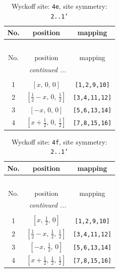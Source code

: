 \documentclass[fleqn,8pt]{jsarticle}
\begin{document}
\begin{longtable}{ccc}
\caption{Wyckoff site: {\tt 4e}, site symmetry: {\tt 2..1'}}
 \\
 \hline \hline
No. & position & mapping \\ \hline \endfirsthead

\multicolumn{2}{l}{\tablename\ \thetable{}} \\
 \hline \hline
No. & position & mapping \\ \hline \endhead

 \hline \hline
\multicolumn{2}{r}{\footnotesize\it continued ...} \\ \endfoot

 \hline \hline
\multicolumn{2}{r}{} \\ \endlastfoot

1 & $\left[ x,\, 0,\, 0 \right]$ & {\tt [1,2,9,10]} \\ \hline
2 & $\left[ \frac{1}{2} - x,\, 0,\, \frac{1}{2} \right]$ & {\tt [3,4,11,12]} \\ \hline
3 & $\left[ - x,\, 0,\, 0 \right]$ & {\tt [5,6,13,14]} \\ \hline
4 & $\left[ x + \frac{1}{2},\, 0,\, \frac{1}{2} \right]$ & {\tt [7,8,15,16]} \\
\end{longtable}
\renewcommand{\arraystretch}{1.2}
\begin{longtable}{ccc}
\caption{Wyckoff site: {\tt 4f}, site symmetry: {\tt 2..1'}}
 \\
 \hline \hline
No. & position & mapping \\ \hline \endfirsthead

\multicolumn{2}{l}{\tablename\ \thetable{}} \\
 \hline \hline
No. & position & mapping \\ \hline \endhead

 \hline \hline
\multicolumn{2}{r}{\footnotesize\it continued ...} \\ \endfoot

 \hline \hline
\multicolumn{2}{r}{} \\ \endlastfoot

1 & $\left[ x,\, \frac{1}{2},\, 0 \right]$ & {\tt [1,2,9,10]} \\ \hline
2 & $\left[ \frac{1}{2} - x,\, \frac{1}{2},\, \frac{1}{2} \right]$ & {\tt [3,4,11,12]} \\ \hline
3 & $\left[ - x,\, \frac{1}{2},\, 0 \right]$ & {\tt [5,6,13,14]} \\ \hline
4 & $\left[ x + \frac{1}{2},\, \frac{1}{2},\, \frac{1}{2} \right]$ & {\tt [7,8,15,16]} \\
\end{longtable}
\end{document}
